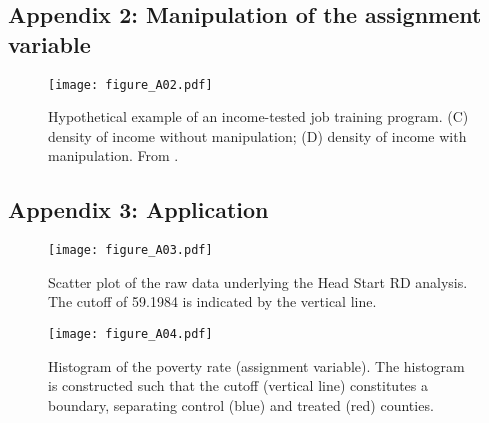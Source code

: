 \clearpage

\subsection*{Appendix 2: Manipulation of the assignment variable} \label{appendix:manipulation}

\begin{figure}[h]
	\centering
	\texttt{[image: figure\_A02.pdf]}
	\caption{Hypothetical example of an income-tested job training program.
			 (C) density of income without manipulation; (D) density of income with manipulation.
		 	 From \textcite[Fig.~2]{McCrary_2008}.}
	\label{fig:McCrary}
\end{figure}

\clearpage

\subsection*{Appendix 3: Application} \label{appendix:application}
\vfill
\begin{figure}[h!]
	\centering
	\texttt{[image: figure\_A03.pdf]}
	\caption{Scatter plot of the raw data underlying the Head Start RD analysis.
			 The cutoff of 59.1984 is indicated by the vertical line.}
	\label{fig:scatter}
\end{figure}
\vfill
\begin{figure}[h!]
	\centering
	\texttt{[image: figure\_A04.pdf]}
	\caption{Histogram of the poverty rate (assignment variable).
			 The histogram is constructed such that the cutoff (vertical line) constitutes a boundary,
		 	 separating control (blue) and treated (red) counties.}
	\label{fig:histogram}
\end{figure}
\vfill

\clearpage

